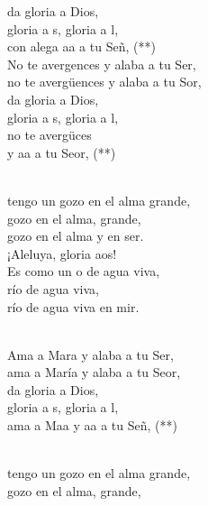 \documentclass[12pt]{article}
\begin{document}
\begin{multicols*}{2}
\begin{cancion}
        da gloria a Dios,\\
            gloria a s, gloria a l,\\
            con alega aa a tu Señ, (**)  \\
        \jump
            No te avergences y alaba a tu Ser,\\
            no te avergüences y alaba a tu Sor, \\
        da gloria a Dios,\\
            gloria a s, gloria a l,\\
            no te avergüces  \\
            y aa a tu Seor, (**)\\\jump\\
            \begin{chorus}%
             tengo un gozo en el alma grande,\\
        gozo en el alma, grande,\\
            gozo en el alma y en ser.\\
            ¡Aleluya, gloria aos!\\
            Es como un o de agua viva, \\
        río de agua viva,\\
            río de agua viva en mir. \\
            \end{chorus}%
            \jump\\
            Ama a Mara y alaba a tu Ser,\\
            ama a María y alaba a tu Seor,\\
        da gloria a Dios,\\
            gloria a s, gloria a l,\\
            ama a Maa y aa a tu Señ, (**)  \\\jump\\
            \begin{chorus}%
             tengo un gozo en el alma grande,\\
        gozo en el alma, grande,\\

\end{chorus}
\end{cancion}
\end{multicols*}
\end{document}
